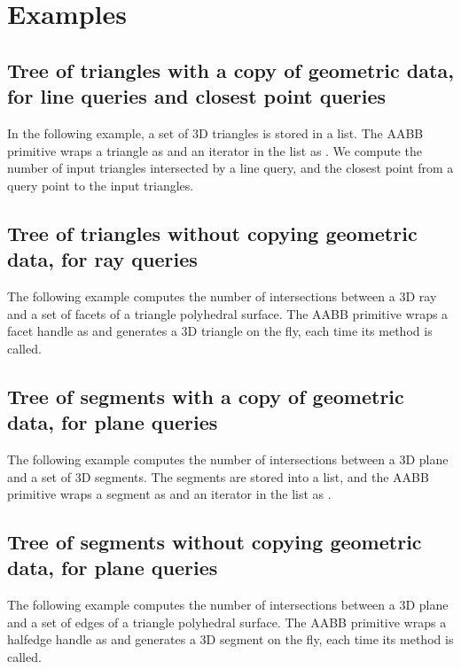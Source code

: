 \section{Examples}
\label{AABB_tree_section_examples}

\subsection{Tree of triangles with a copy of geometric data, for line queries and closest point queries}
In the following example, a set of 3D triangles is stored in a list. The AABB primitive wraps a triangle as  and an iterator in the list as . We compute the number of input triangles intersected by a line query, and the closest point from a query point to the input triangles.

\subsection{Tree of triangles without copying geometric data, for ray queries}
The following example computes the number of intersections between a 3D ray and a set of facets of a triangle polyhedral surface. The AABB primitive wraps a facet handle as  and generates a 3D triangle on the fly, each time its method  is called.

\subsection{Tree of segments with a copy of geometric data, for plane queries}
The following example computes the number of intersections between a 3D plane and a set of 3D segments. The segments are stored into a list, and the AABB primitive wraps a segment as  and an iterator in the list as .

\subsection{Tree of segments without copying geometric data, for plane queries}
The following example computes the number of intersections between a 3D plane and a set of edges of a triangle polyhedral surface. The AABB primitive wraps a halfedge handle as  and generates a 3D segment on the fly, each time its method  is called.
